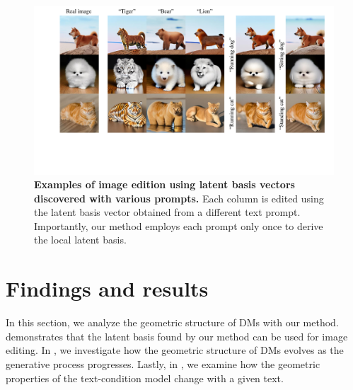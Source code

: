 \begin{figure}[!t]
    \centering
    \includegraphics[width=1\linewidth]{figure/local_text_main.pdf}
    \vspace{-1.5em}
    \caption{\textbf{Examples of image edition using latent basis vectors discovered with various prompts.}
    {Each column is edited using the latent basis vector obtained from a different text prompt. Importantly, our method employs each prompt only once to derive the local latent basis.}
    }
    \vspace{-1em}
    \label{fig:local_basis_text}
\end{figure}

\section{Findings and results}
In this section, we analyze the geometric structure of DMs with our method.
 demonstrates that the latent basis found by our method can be used for image editing.
In , we investigate how the geometric structure of DMs evolves as the generative process progresses. 
Lastly, in , we examine how the geometric properties of the text-condition model change with a given text. %



